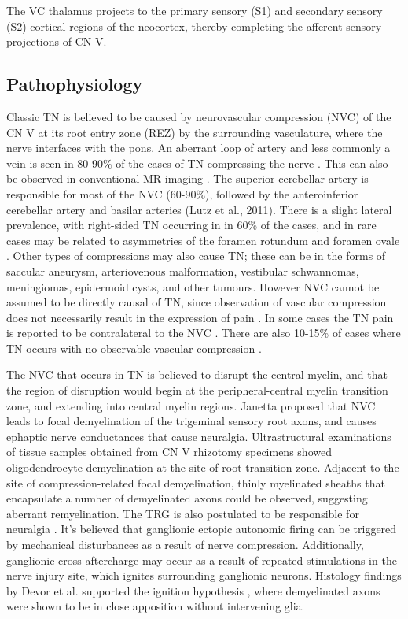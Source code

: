 The VC thalamus projects to the primary sensory (S1) and secondary sensory (S2) cortical regions of the neocortex, thereby completing the afferent sensory projections of CN V. 



\subsection{Pathophysiology}

Classic TN is believed to be caused by neurovascular compression (NVC) of the CN V at its root entry zone (REZ) by the surrounding vasculature, where the nerve interfaces with the pons. An aberrant loop of artery and less commonly a vein is seen in 80-90\% of the cases of TN compressing the nerve \cite{Love2001,McLaughlin1999}. This can also be observed in conventional MR imaging \cite{Borges2010}. The superior cerebellar artery is responsible for most of the NVC (60-90\%), followed by the anteroinferior cerebellar artery and basilar arteries (Lutz et al., 2011). There is a slight lateral prevalence, with right-sided TN occurring in  in 60\% of the cases, and in rare cases may be related to asymmetries of the foramen rotundum and foramen ovale \cite{Toda2009}.  Other types of compressions may also cause TN; these can be in the forms of saccular aneurysm, arteriovenous malformation, vestibular schwannomas, meningiomas, epidermoid cysts, and other tumours.  However NVC cannot be assumed to be directly causal of TN, since observation of vascular compression does not necessarily result in the expression of pain \cite{Desouza2013,Hodaie2013}. In some cases the TN pain is reported to be contralateral to the NVC \cite{Cheng2008,Haddad1990,Revuelta1995}. There are also 10-15\% of cases where TN occurs with no observable vascular compression \cite{Revuelta-Gutierrez2006,Maarbjerg2015}.


The NVC that occurs in TN is believed to disrupt the central myelin, and that the region of disruption would begin at the peripheral-central myelin transition zone, and extending into central myelin regions. Janetta \cite{Jannetta1967} proposed that NVC leads to focal demyelination of the trigeminal sensory root axons, and causes ephaptic nerve conductances that cause neuralgia. Ultrastructural examinations \cite{Love1998} of tissue samples obtained from CN V rhizotomy specimens showed oligodendrocyte demyelination at the site of root transition zone. Adjacent to the site of compression-related focal demyelination, thinly myelinated sheaths that encapsulate a number of demyelinated axons could be observed, suggesting aberrant remyelination. The TRG is also postulated to be responsible for neuralgia \cite{Rappaport1994}. It's believed that ganglionic ectopic autonomic firing can be triggered by mechanical disturbances as a result of nerve compression. Additionally, ganglionic cross aftercharge may occur as a result of repeated stimulations in the nerve injury site, which ignites surrounding ganglionic neurons. Histology findings by Devor et al. supported the ignition hypothesis \cite{Devor2002a}, where demyelinated axons were shown to be in close apposition without intervening glia. 

